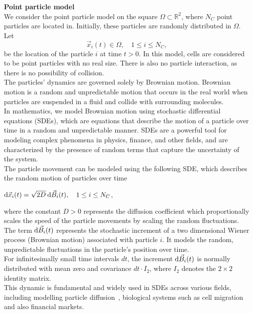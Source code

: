 \textbf{Point particle model} \\
We consider the point particle model on the square $\Omega \subset \mathbb{R}^2$, where $N_C$ point particles are located in.
Initially, these particles are randomly distributed in $\Omega$. \\
Let 
\[
\vec{x}_i(t) \in \Omega, \quad 1 \leq i \leq N_C,
\]
be the location of the particle $i$ at time $t > 0$. 
In this model, cells are considered to be point particles with no real size. 
There is also no particle interaction, as there is no possibility of collision. \\
The particles' dynamics are governed solely by Brownian motion.
Brownian motion is a random and unpredictable motion that occurs in the real world when particles are suspended in a fluid and collide with surrounding molecules. \\
In mathematics, we model Brownian motion using stochastic differential equations (SDEs), which are equations that describe the motion of a particle over time in a random and unpredictable manner. 
SDEs are a powerful tool for modeling complex phenomena in physics, finance, and other fields, and are characterized by the presence of random terms that capture the uncertainty of the system. \\
The particle movement can be modeled using the following SDE, which describes the random motion of particles over time
\begin{center}
	$\mathrm{d} \vec{x}_i(t) = \sqrt{2D} \: \mathrm{d} \vec{B}_i(t), \quad 1 \leq i \leq N_C$,
\end{center}
where the constant $D > 0$ represents the diffusion coefficient which proportionally scales the speed of the particle movements by scaling the random fluctuations. \\
The term $\mathrm{d} \vec{B}_i(t) $ represents the stochastic increment of a two dimensional Wiener process (Brownian motion) associated with particle $i$. 
It models the random, unpredictable fluctuations in the particle's position over time. \\
For infinitesimally small time intervals $ dt $, the increment $ \mathrm{d} \vec{B}_i(t) $ is normally distributed with mean zero and covariance $ dt \cdot I_2$, where $I_2$ denotes the $2 \times 2$ identity matrix. \\  
This dynamic is fundamental and widely used in SDEs across various fields, including modelling particle diffusion~\cite{Bruna2012}, biological systems such as cell migration and also financial markets. \\ 

